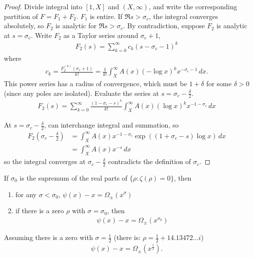 \documentclass{article}
\newcommand{\1}{\mathbbm{1}}
\begin{document}
\begin{proof}
  Divide integral into $[1,X]$ and $(X,\infty)$, and write the corresponding partition of $F = F_1 + F_2$.
  $F_1$ is entire. If $\Re s > \sigma_c$, the integral converges absolutely, so $F_2$ is analytic for $\Re s > \sigma_c$.
  By contradiction, suppose $F_2$ is analytic at $s =\sigma_c$.
  Write $F_2$ as a Taylor series around $\sigma_c + 1$,
  \begin{align*}
    F_2(s) = \sum_{k=0}^\infty c_k (s-\sigma_c-1)^k
  \end{align*}
  where
  \begin{align*}
    c_k = \frac{F_2^{(k)}(\sigma_c+1)}{k!} = \frac{1}{k!} \int_X^\infty A(x) (-\log x)^k x^{-\sigma_c-1}\,dx.
  \end{align*}
  This power series has a radius of convergence, which must be $1+\delta$ for some $\delta>0$ (since any poles are isolated).
  Evaluate the series at $s = \sigma_c - \frac{\delta}{2}$.
  \begin{align*}
    F_2(s) = \sum_{k=0}^\infty \frac{(1-\sigma_c-s)^k}{k!} \int_X^\infty A(x) (\log x)^k x^{-1-\sigma_c}\,dx
  \end{align*}

  At $s=\sigma_c - \frac{\delta}{2}$, can interchange integral and summation, so
  \begin{align*}
    F_2(\sigma_c-\frac{\delta}{2}) &= \int_X^\infty A(x) x^{-1-\sigma_c} \exp((1+\sigma_c-s) \log x)\,dx \\
                                   &= \int_X^\infty A(x) x^{-s} \,dx
  \end{align*}
  so the integral converges at $\sigma_c - \frac{\delta}{2}$ contradicts the definition of $\sigma_c$.
\end{proof}
\begin{thm}[Landau]
  If $\sigma_0$ is the supremum of the real parts of $\{\rho : \zeta(\rho) = 0\}$, then
  \begin{enumerate}
    \item for any $\sigma < \sigma_0$, $\psi(x) - x = \Omega_\pm(x^\sigma)$
    \item if there is a zero $\rho$ with $\sigma = \sigma_0$, then
      \begin{align*}
        \psi(x) - x = \Omega_\pm (x^{\sigma_0})
      \end{align*}
  \end{enumerate}
\end{thm}
\begin{cor}
  Assuming there is a zero with $\sigma = \frac{1}{2}$ (there is: $\rho = \frac{1}{2} + 14.13472\dots i$)
  \begin{align*}
    \psi(x) - x = \Omega_{\pm}(x^{\frac 12}).
  \end{align*}
\end{cor}
\end{document}

